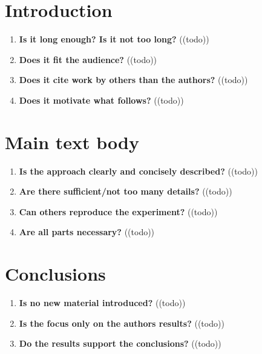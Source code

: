 \section{Introduction}\label{sec:introduction}
\begin{enumerate}[resume]
    \item \textbf{Is it long enough? Is it not too long?} 	\textcolor{HighlightColor}{((todo))}
    \item \textbf{Does it fit the audience?} 	\textcolor{HighlightColor}{((todo))}
    \item \textbf{Does it cite work by others than the authors?} 	\textcolor{HighlightColor}{((todo))}
    \item \textbf{Does it motivate what follows?} 	\textcolor{HighlightColor}{((todo))}
\end{enumerate}

\section{Main text body}\label{sec:main}
\begin{enumerate}[resume]
    \item \textbf{Is the approach clearly and concisely described?} 	\textcolor{HighlightColor}{((todo))}
    \item \textbf{Are there sufficient/not too many details?} 	\textcolor{HighlightColor}{((todo))}
    \item \textbf{Can others reproduce the experiment?} 	\textcolor{HighlightColor}{((todo))}
    \item \textbf{Are all parts necessary?} 	\textcolor{HighlightColor}{((todo))}
\end{enumerate}

\section{Conclusions}\label{sec:conclusions}
\begin{enumerate}[resume]
    \item \textbf{Is no new material introduced?} 	\textcolor{HighlightColor}{((todo))}
    \item \textbf{Is the focus only on the authors results?} 	\textcolor{HighlightColor}{((todo))}
    \item \textbf{Do the results support the conclusions?} 	\textcolor{HighlightColor}{((todo))}
\end{enumerate}

